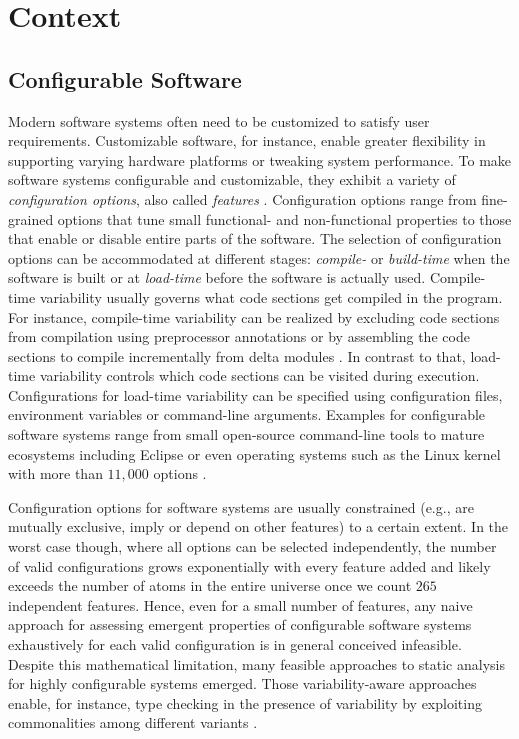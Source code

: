 \section{Context}
\subsection{Configurable Software}
Modern software systems often need to
be customized to satisfy user requirements. Customizable software, for instance,
enable greater flexibility in supporting varying hardware platforms or tweaking
system performance. To make software systems configurable and customizable, they
exhibit a variety of \emph{configuration options}, also called
\emph{features} \citep{apel_feature-oriented_2013}.
Configuration options range from fine-grained options that tune small
functional- and non-functional properties to those that enable or disable entire
parts of the software. The selection of configuration options can be
accommodated at different stages: \emph{compile-} or \emph{build-time} when the
software is built or at \emph{load-time} before the software is actually used.
Compile-time variability usually governs what code sections get
compiled in the program. For instance, compile-time variability can be
realized by excluding code sections from compilation using preprocessor
annotations \citep{hunsen_preprocessor-based_2016} or by assembling the code
sections to compile incrementally from delta modules
\citep{schaefer_delta-oriented_2010}. In contrast to that, load-time variability
controls which code sections can be visited during execution. Configurations for
load-time variability can be specified using configuration files, environment
variables or command-line arguments. Examples for configurable software systems
range from small open-source command-line tools to mature ecosystems including
Eclipse or even operating systems such as the Linux kernel with more than
$11,000$ options \citep{dietrich_robust_2012}.

Configuration options for
software systems are usually constrained (e.g., are mutually exclusive, imply
or depend on other features) to a certain extent. In the worst case though,
where all options can be selected independently, the number of valid
configurations grows exponentially with every feature added and likely exceeds
the number of atoms in the entire universe once we count $265$ independent
features. Hence, even for a small number of features, any naive approach for
assessing emergent properties of configurable software systems exhaustively for
each valid configuration is in general conceived infeasible. Despite this
mathematical limitation, many feasible approaches to static analysis for highly
configurable systems emerged. Those variability-aware approaches enable, for
instance, type checking in the presence of variability by exploiting
commonalities among different variants \citep{thum_classification_2014}.

